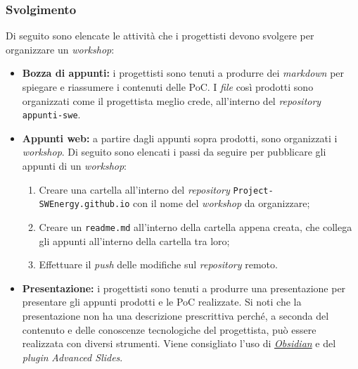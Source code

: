 \subsubsection{Svolgimento}
Di seguito sono elencate le attività che i progettisti devono svolgere per
organizzare un \textit{workshop}:
\begin{itemize}
	\item \textbf{Bozza di appunti:} i progettisti sono tenuti a produrre dei
	      \textit{markdown} per spiegare e riassumere i contenuti delle PoC. I
	      \textit{file} così prodotti sono organizzati come il progettista
	      meglio crede, all'interno del \textit{repository}
	      \texttt{appunti-swe}.

	\item \textbf{Appunti web:} a partire dagli appunti sopra prodotti, sono
	      organizzati i \textit{workshop}. Di seguito sono elencati i passi da
	      seguire per pubblicare gli appunti di un \textit{workshop}:
	      \begin{enumerate}
		      \item Creare una cartella all'interno del \textit{repository}
		            \texttt{Project-SWEnergy.github.io} con il nome del
		            \textit{workshop} da organizzare;

		      \item Creare un \texttt{readme.md} all'interno della
		            cartella appena creata, che collega gli appunti all'interno
		            della cartella tra loro;

		      \item Effettuare il \textit{push} delle modifiche sul
		            \textit{repository} remoto.
	      \end{enumerate}

	\item \textbf{Presentazione:} i progettisti sono tenuti a produrre una
	      presentazione per presentare gli appunti prodotti e le PoC realizzate.
	      Si noti che la presentazione non ha una descrizione prescrittiva
	      perché, a seconda del contenuto e delle conoscenze tecnologiche del
	      progettista, può essere realizzata con diversi strumenti. Viene
	      consigliato l'uso di \href{https://obsidian.md/}{\textit{Obsidian}} e
	      del \textit{plugin} \textit{Advanced Slides}.
\end{itemize}

